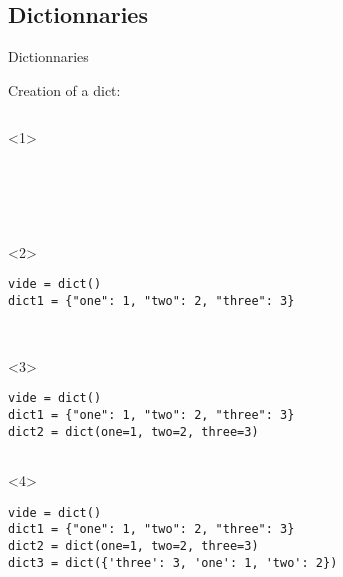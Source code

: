 \subsection{Dictionnaries}

\begin{frame}[fragile]{Dictionnaries}

  \begin{center}

  Creation of a dict:

  \medskip

  \begin{columns}[onlytextwidth]
    \begin{column}{\textwidth}

      \begin{onlyenv}<1>
        \begin{lstlisting}[style=python,morekeywords={for, in, range, list},basicstyle=\ttfamily\small]





 \end{lstlisting}
      \end{onlyenv}

      \begin{onlyenv}<2>
        \begin{lstlisting}[style=python,morekeywords={for, in, range, list},basicstyle=\ttfamily\small]
vide = dict()
dict1 = {"one": 1, "two": 2, "three": 3}



 \end{lstlisting}
      \end{onlyenv}

      \begin{onlyenv}<3>
        \begin{lstlisting}[style=python,morekeywords={for, in, range, list},basicstyle=\ttfamily\small]
vide = dict()
dict1 = {"one": 1, "two": 2, "three": 3}
dict2 = dict(one=1, two=2, three=3)


 \end{lstlisting}
      \end{onlyenv}

      \begin{onlyenv}<4>
        \begin{lstlisting}[style=python,morekeywords={for, in, range, list},basicstyle=\ttfamily\small]
vide = dict()
dict1 = {"one": 1, "two": 2, "three": 3}
dict2 = dict(one=1, two=2, three=3)
dict3 = dict({'three': 3, 'one': 1, 'two': 2})


\end{lstlisting}
\end{onlyenv}
\end{column}
\end{columns}
\end{center}
\end{frame}
